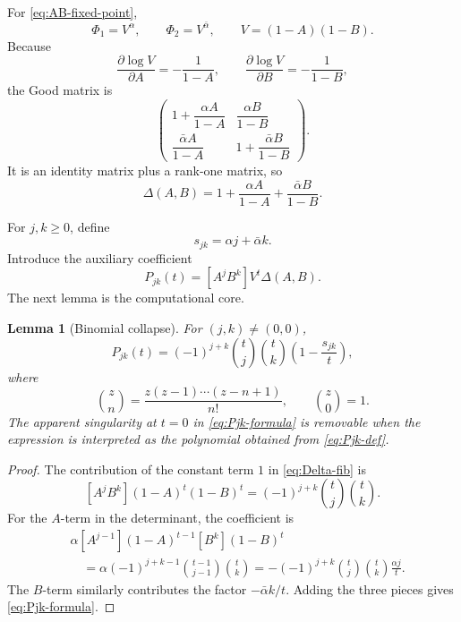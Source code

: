 \documentclass[11pt,oneside]{article}
\numberwithin{equation}{section}
\theoremstyle{plain}
\newtheorem{lemma}[theorem]{Lemma}
\theoremstyle{definition}
\theoremstyle{remark}
\begin{document}
For \cref{eq:AB-fixed-point},
\[
 \Phi_1=V^\alpha,
 \qquad
 \Phi_2=V^{\bar\alpha},
 \qquad
 V=(1-A)(1-B).
\]
Because
\[
 \frac{\partial\log V}{\partial A}=-\frac1{1-A},
 \qquad
 \frac{\partial\log V}{\partial B}=-\frac1{1-B},
\]
the Good matrix is
\[
 \begin{pmatrix}
  1+\dfrac{\alpha A}{1-A} & \dfrac{\alpha B}{1-B}\\[0.8em]
  \dfrac{\bar\alpha A}{1-A} & 1+\dfrac{\bar\alpha B}{1-B}
 \end{pmatrix}.
\]
It is an identity matrix plus a rank-one matrix, so
\begin{equation}\label{eq:Delta-fib}
 \Delta(A,B)=1+\frac{\alpha A}{1-A}
                +\frac{\bar\alpha B}{1-B}.
\end{equation}

For \(j,k\ge0\), define
\begin{equation}\label{eq:sjk-repeat}
 s_{jk}=\alpha j+\bar\alpha k.
\end{equation}
Introduce the auxiliary coefficient
\begin{equation}\label{eq:Pjk-def}
 P_{jk}(t)=[A^jB^k]V^t\Delta(A,B).
\end{equation}
The next lemma is the computational core.

\begin{lemma}[Binomial collapse]\label{lem:binomial-collapse}
For \((j,k)\ne(0,0)\),
\begin{equation}\label{eq:Pjk-formula}
 P_{jk}(t)=(-1)^{j+k}
 \binom tj\binom tk\left(1-\frac{s_{jk}}t\right),
\end{equation}
where
\begin{equation}\label{eq:generalized-binomial}
 \binom zn=\frac{z(z-1)\cdots(z-n+1)}{n!},
 \qquad \binom z0=1.
\end{equation}
The apparent singularity at \(t=0\) in \cref{eq:Pjk-formula} is removable
when the expression is interpreted as the polynomial obtained from
\cref{eq:Pjk-def}.
\end{lemma}

\begin{proof}
The contribution of the constant term \(1\) in \cref{eq:Delta-fib} is
\[
 [A^jB^k](1-A)^t(1-B)^t
 =(-1)^{j+k}\binom tj\binom tk.
\]
For the \(A\)-term in the determinant, the coefficient is
\begin{align*}
 &\alpha[A^{j-1}](1-A)^{t-1}[B^k](1-B)^t\\
 &\quad=\alpha(-1)^{j+k-1}
          \binom{t-1}{j-1}\binom tk
 =-(-1)^{j+k}\binom tj\binom tk\frac{\alpha j}{t}.
\end{align*}
The \(B\)-term similarly contributes the factor
\(-\bar\alpha k/t\).  Adding the three pieces gives
\cref{eq:Pjk-formula}.
\end{proof}
\end{document}
